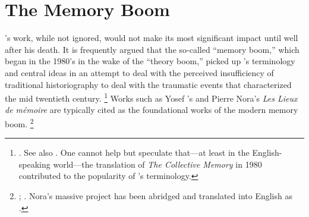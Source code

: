 
\section{The Memory Boom}

\halbwachs's work, while not ignored, would not make its most significant impact until well after his death. It is frequently argued that the so-called ``memory boom,'' which began in the 1980's in the wake of the ``theory boom,'' picked up \halbwachs's terminology and central ideas in an attempt to deal with the perceived insufficiency of traditional historiography to deal with the traumatic events that characterized the mid twentieth century.%
    \footnote{%
        \Cite[1--2]{galinsky_galinsky2016}. See also 
        \cite[29--36]{olick_olick-etal2011}. One cannot help but speculate that---at least in the English-speaking world---the translation of \emph{The Collective Memory} in 1980 contributed to the popularity of \halbwachs's terminology.}
%
Works such as Yosef \yerushalmi's  and Pierre Nora's \emph{Les Lieux de mémoire} are typically cited as the foundational works of the modern memory boom.%
    \footnote{%
        \Cite[112--113]{klein2011};
        \cite{yerushalmi1989}. Nora's massive project has been abridged and translated into English as
        \cite{nora1996}.}

